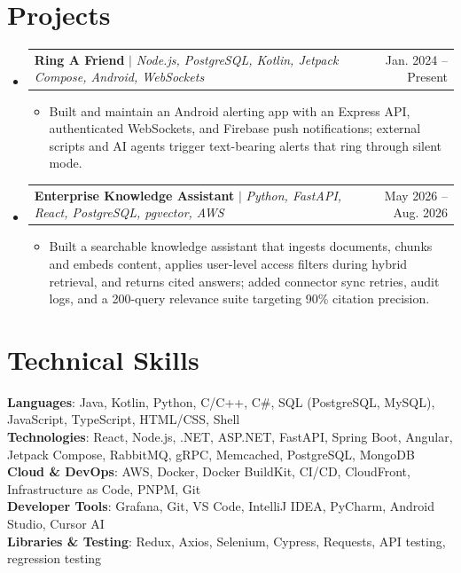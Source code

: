 \documentclass[letterpaper,11pt]{article}
\makeatletter
\newcommand{\resumeItem}[1]{
  \item\small{
    {#1 \vspace{-2pt}}
  }
}
\newcommand{\resumeProjectHeading}[2]{
    \item
    \begin{tabular*}{0.97\textwidth}{l@{\extracolsep{\fill}}r}
      \small#1 & #2 \\
    \end{tabular*}\vspace{-7pt}
}
\newcommand{\resumeSubHeadingListStart}{\begin{itemize}[leftmargin=0.15in, label={}]}
\newcommand{\resumeSubHeadingListEnd}{\end{itemize}}
\newcommand{\resumeItemListStart}{\begin{itemize}}
\newcommand{\resumeItemListEnd}{\end{itemize}\vspace{-5pt}}
\makeatother
\begin{document}
\section{Projects}
\resumeSubHeadingListStart
\resumeProjectHeading
{\textbf{Ring A Friend} $|$ \emph{Node.js, PostgreSQL, Kotlin, Jetpack Compose, Android, WebSockets}}{Jan. 2024 -- Present}
\resumeItemListStart
\resumeItem{Built and maintain an Android alerting app with an Express API, authenticated WebSockets, and Firebase push notifications; external scripts and AI agents trigger text-bearing alerts that ring through silent mode.}
\resumeItemListEnd
\resumeProjectHeading
{\textbf{Enterprise Knowledge Assistant} $|$ \emph{Python, FastAPI, React, PostgreSQL, pgvector, AWS}}{May 2026 -- Aug. 2026}
\resumeItemListStart
\resumeItem{Built a searchable knowledge assistant that ingests documents, chunks and embeds content, applies user-level access filters during hybrid retrieval, and returns cited answers; added connector sync retries, audit logs, and a 200-query relevance suite targeting 90\% citation precision.}
\resumeItemListEnd
\resumeSubHeadingListEnd


\section{Technical Skills}
\begin{itemize}[leftmargin=0.15in, label={}]
  \small{\item{
        \textbf{Languages}{: Java, Kotlin, Python, C/C++, C\#, SQL (PostgreSQL, MySQL), JavaScript, TypeScript, HTML/CSS, Shell} \\
        \textbf{Technologies}{: React, Node.js, .NET, ASP.NET, FastAPI, Spring Boot, Angular, Jetpack Compose, RabbitMQ, gRPC, Memcached, PostgreSQL, MongoDB} \\
        \textbf{Cloud \& DevOps}{: AWS, Docker, Docker BuildKit, CI/CD, CloudFront, Infrastructure as Code, PNPM, Git} \\
        \textbf{Developer Tools}{: Grafana, Git, VS Code, IntelliJ IDEA, PyCharm, Android Studio, Cursor AI} \\
        \textbf{Libraries \& Testing}{: Redux, Axios, Selenium, Cypress, Requests, API testing, regression testing}
        }}
\end{itemize}


\end{document}
